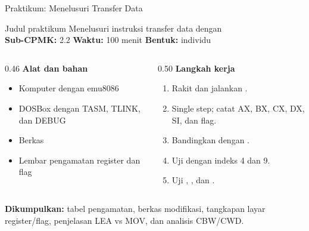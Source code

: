 \documentclass[aspectratio=169,11pt]{beamer}
\begin{document}
\begin{frame}{Praktikum: Menelusuri Transfer Data}
\begin{block}{Judul praktikum}
\small Menelusuri instruksi transfer data dengan \\[0.15em]
\textbf{Sub-CPMK:} 2.2 \quad\textbullet\quad
\textbf{Waktu:} 100 menit \quad\textbullet\quad
\textbf{Bentuk:} individu
\end{block}

\vspace{0.2em}
\begin{columns}[t]
\begin{column}{0.46\textwidth}
{\color{obeBlue}\bfseries Alat dan bahan}
\begin{itemize}\footnotesize
    \item Komputer dengan emu8086
    \item DOSBox dengan TASM, TLINK, dan DEBUG
    \item Berkas 
    \item Lembar pengamatan register dan flag
\end{itemize}
\end{column}
\begin{column}{0.50\textwidth}
{\color{obeBlue}\bfseries Langkah kerja}
\begin{enumerate}\footnotesize
    \item Rakit dan jalankan .
    \item Single step; catat AX, BX, CX, DX, SI, dan flag.
    \item Bandingkan  dengan .
    \item Uji  dengan indeks 4 dan 9.
    \item Uji , , dan .
\end{enumerate}
\end{column}
\end{columns}

\vspace{0.2em}
{\footnotesize\textbf{Dikumpulkan:} tabel pengamatan, berkas
 modifikasi, tangkapan layar register/flag, penjelasan
LEA vs MOV, dan analisis CBW/CWD.\par}
\end{frame}
\end{document}
